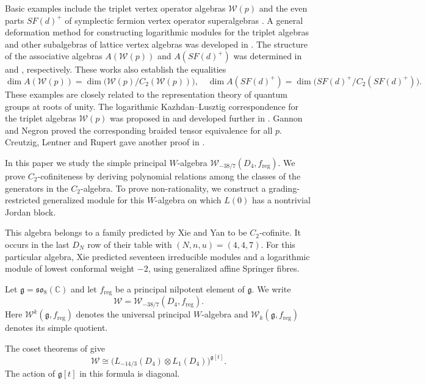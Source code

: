 \documentclass[11pt]{amsart}
\numberwithin{equation}{section}
\theoremstyle{definition}
\theoremstyle{remark}
\newcommand{\CC}{\mathbb C}
\newcommand{\g}{\mathfrak g}
\newcommand{\W}{\mathcal W}
\newcommand{\reg}{\mathrm{reg}}
\begin{document}
Basic examples include the triplet vertex operator algebras
$\mathcal W(p)$ and the even parts $SF(d)^+$ of symplectic
fermion vertex operator superalgebras \cite{Abe, AM08}.
A general deformation method for constructing logarithmic
modules for the triplet algebras and other subalgebras of
lattice vertex algebras was developed in \cite{AM09}.
The structure of the associative algebras $A(\mathcal W(p))$ and $A(SF(d)^+)$
was determined in \cite{AM11} and \cite{Abe,AC20}, respectively.
These works also establish the equalities
\[
 \dim A(\mathcal W(p))
 =\dim\bigl(\mathcal W(p)/C_2(\mathcal W(p))\bigr),   \quad  \dim A(SF(d)^+)
 =\dim\bigl(SF(d)^+/C_2( SF(d)^+)\bigr).
\]
These examples are closely related to the
representation theory of quantum groups at roots of unity.
 The logarithmic Kazhdan--Lusztig correspondence for the triplet
algebras $\mathcal W(p)$ was proposed in \cite{FGST1,FGST2}
and developed further in \cite{NT,CGR}.
Gannon and Negron \cite{GN} proved the corresponding braided tensor
equivalence for all $p$. Creutzig, Lentner and Rupert gave another
proof in \cite{CLR}.

In this paper we study the simple principal $W$-algebra
$\mathcal W_{-38/7}(D_4,f_{\mathrm{reg}})$.
We prove $C_2$-cofiniteness by deriving polynomial relations among the
classes of the generators in the $C_2$-algebra. To prove non-rationality,
we construct a grading-restricted generalized module for this $W$-algebra
on which $L(0)$ has a nontrivial Jordan block.

This algebra belongs to a family predicted by Xie and Yan
\cite[Table~13]{XY} to be $C_2$-cofinite. It occurs in the last
$D_N$ row of their table with $(N,n,u)=(4,4,7)$.
For this particular algebra,
Xie \cite[Section~6.1.1 and Table~7]{Xie} predicted seventeen
irreducible modules and a logarithmic module of lowest conformal weight
$-2$, using generalized affine Springer fibres.

Let $\g=\mathfrak{so}_8(\CC)$ and let $f_{\reg}$ be a principal
nilpotent element of $\g$. We write
\begin{equation}\label{eq:levels}
 \mathcal W=\W_{-38/7}(D_4,f_{\reg}).
\end{equation}
Here $\W^k(\g,f_{\reg})$ denotes the universal principal
$W$-algebra and $\W_k(\g,f_{\reg})$ denotes its simple quotient.

The coset theorems of \cite{ACK,ACL} give
\begin{equation}\label{eq:coset-intro}
 \mathcal W\cong
 \bigl(L_{-14/3}(D_4)\otimes L_1(D_4)\bigr)^{\g[t]}.
\end{equation}
The action of $\g[t]$ in this formula is diagonal.
\end{document}
